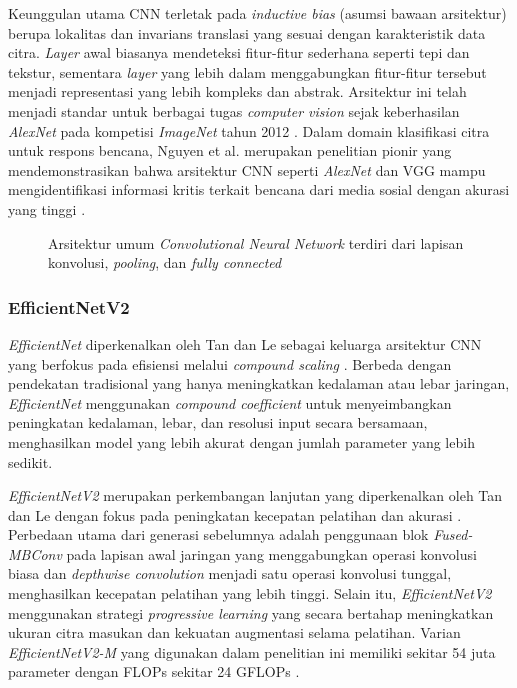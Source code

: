 Keunggulan utama CNN terletak pada \textit{inductive bias} (asumsi
bawaan arsitektur) berupa lokalitas dan invarians translasi yang sesuai
dengan karakteristik data citra. \textit{Layer} awal biasanya
mendeteksi fitur-fitur sederhana seperti tepi dan tekstur, sementara
\textit{layer} yang lebih dalam menggabungkan fitur-fitur tersebut
menjadi representasi yang lebih kompleks dan abstrak. Arsitektur ini
telah menjadi standar untuk berbagai tugas \textit{computer vision}
sejak keberhasilan \textit{AlexNet} pada kompetisi \textit{ImageNet}
tahun 2012 \cite{krizhevsky2012alexnet}. Dalam domain klasifikasi
citra untuk respons bencana, Nguyen et al. merupakan penelitian pionir
yang mendemonstrasikan bahwa arsitektur CNN seperti \textit{AlexNet}
dan VGG mampu mengidentifikasi informasi kritis terkait bencana dari
media sosial dengan akurasi yang tinggi \cite{nguyen2017robust}. \par

\begin{figure}[h]
    \centering
    \fbox{\rule{0pt}{4cm}\rule{0.85\textwidth}{0pt}}
    \caption{Arsitektur umum \textit{Convolutional Neural Network}
    terdiri dari lapisan konvolusi, \textit{pooling}, dan
    \textit{fully connected} \cite{lecun1998gradient}}
    \label{fig:cnn_architecture}
\end{figure}

\subsubsection{EfficientNetV2}
\textit{EfficientNet} diperkenalkan oleh Tan dan Le sebagai keluarga
arsitektur CNN yang berfokus pada efisiensi melalui \textit{compound
scaling} \cite{tan2019efficientnet}. Berbeda dengan pendekatan
tradisional yang hanya meningkatkan kedalaman atau lebar jaringan,
\textit{EfficientNet} menggunakan \textit{compound coefficient} untuk
menyeimbangkan peningkatan kedalaman, lebar, dan resolusi input secara
bersamaan, menghasilkan model yang lebih akurat dengan jumlah parameter
yang lebih sedikit. \par

\textit{EfficientNetV2} merupakan perkembangan lanjutan yang
diperkenalkan oleh Tan dan Le dengan fokus pada peningkatan kecepatan
pelatihan dan akurasi \cite{tan2021efficientnetv2}. Perbedaan utama
dari generasi sebelumnya adalah penggunaan blok \textit{Fused-MBConv}
pada lapisan awal jaringan yang menggabungkan operasi konvolusi biasa
dan \textit{depthwise convolution} menjadi satu operasi konvolusi tunggal,
menghasilkan kecepatan pelatihan yang lebih tinggi. Selain itu,
\textit{EfficientNetV2} menggunakan strategi \textit{progressive
learning} yang secara bertahap meningkatkan ukuran citra masukan dan
kekuatan augmentasi selama pelatihan. Varian \textit{EfficientNetV2-M}
yang digunakan dalam penelitian ini memiliki sekitar 54 juta parameter
dengan FLOPs sekitar 24 GFLOPs \cite{tan2021efficientnetv2}. \par

